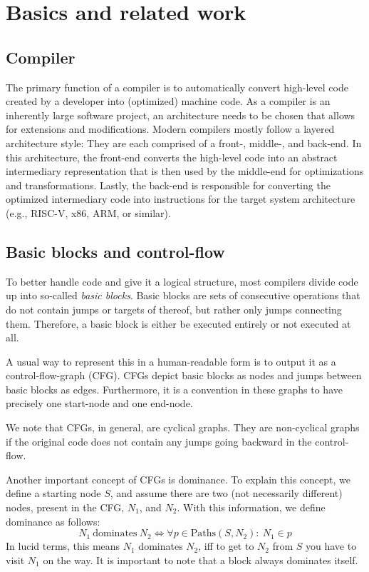 \chapter{Basics and related work}\label{sec:basics}

\section{Compiler}\label{sec:basics:compiler}

The primary function of a compiler is to automatically convert high-level code created by a developer into (optimized) machine code.
As a compiler is an inherently large software project, an architecture needs to be chosen that allows for extensions and modifications.
Modern compilers mostly follow a layered architecture style: They are each comprised of a front-, middle-, and back-end.
In this architecture, the front-end converts the high-level code into an abstract intermediary representation that is then used by the middle-end for optimizations and transformations.
Lastly, the back-end is responsible for converting the optimized intermediary code into instructions for the target system architecture (e.g., RISC-V, x86, ARM, or similar).

\section{Basic blocks and control-flow}\label{sec:basics:bb-cf}

To better handle code and give it a logical structure, most compilers divide code up into so-called \textit{basic blocks}.
Basic blocks are sets of consecutive operations that do not contain jumps or targets of thereof, but rather only jumps connecting them.
Therefore, a basic block is either be executed entirely or not executed at all.

A usual way to represent this in a human-readable form is to output it as a control-flow-graph (CFG).
CFGs depict basic blocks as nodes and jumps between basic blocks as edges.
Furthermore, it is a convention in these graphs to have precisely one start-node and one end-node.

We note that CFGs, in general, are cyclical graphs.
They are non-cyclical graphs if the original code does not contain any jumps going backward in the control-flow.

Another important concept of CFGs is dominance.
To explain this concept, we define a starting node $S$, and assume there are two (not necessarily different) nodes, present in the CFG, $N_1$, and $N_2$.
With this information, we define dominance as follows:
$$N_1~\text{dominates}~N_2 \Longleftrightarrow \forall p \in \text{Paths}(S, N_2):~N_1 \in p$$
In lucid terms, this means $N_1$ dominates $N_2$, iff to get to $N_2$ from $S$ you have to visit $N_1$ on the way.
It is important to note that a block always dominates itself.

